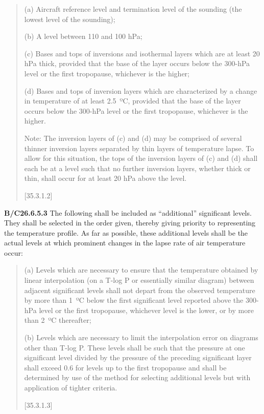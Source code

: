 \begin{quote}
(a) Aircraft reference level and termination level of the sounding (the lowest level of the sounding);

(b) A level between 110 and 100 hPa;

(c) Bases and tops of inversions and isothermal layers which are at least 20 hPa thick, provided that the base of the layer occurs below the 300-hPa level or the first tropopause, whichever is the higher;

(d) Bases and tops of inversion layers which are characterized by a change in temperature of at least 2.5~ºC, provided that the base of the layer occurs below the 300-hPa level or the first tropopause, whichever is the higher.

Note: The inversion layers of (c) and (d) may be comprised of several thinner inversion layers separated by thin layers of temperature lapse. To allow for this situation, the tops of the inversion layers of (c) and (d) shall each be at a level such that no further inversion layers, whether thick or thin, shall occur for at least 20 hPa above the level.

{[}35.3.1.2{]}
\end{quote}

\textbf{B/C26.6.5.3} The following shall be included as ``additional'' significant levels. They shall be selected in the order given, thereby giving priority to representing the temperature profile. As far as possible, these additional levels shall be the actual levels at which prominent changes in the lapse rate of air temperature occur:

\begin{quote}
(a) Levels which are necessary to ensure that the temperature obtained by linear interpolation (on a T-log P or essentially similar diagram) between adjacent significant levels shall not depart from the observed temperature by more than 1~ºC below the first significant level reported above the 300-hPa level or the first tropopause, whichever level is the lower, or by more than 2~ºC thereafter;

(b) Levels which are necessary to limit the interpolation error on diagrams other than T-log P. These levels shall be such that the pressure at one significant level divided by the pressure of the preceding significant layer shall exceed 0.6 for levels up to the first tropopause and shall be determined by use of the method for selecting additional levels but with application of tighter criteria.

{[}35.3.1.3{]}
\end{quote}

